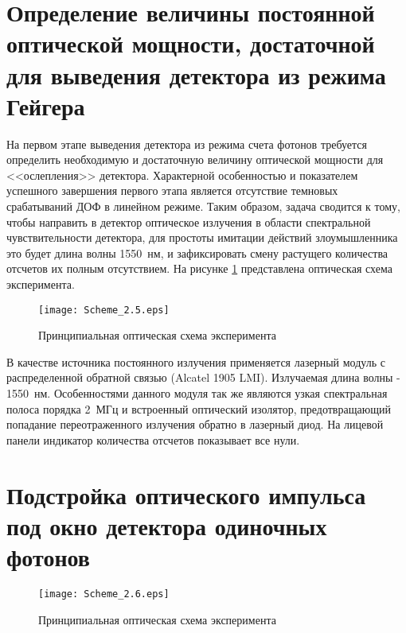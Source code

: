 
\section{Определение величины постоянной оптической мощности, достаточной для выведения детектора из режима Гейгера} \label{sec:ch2/sec5}

На первом этапе выведения детектора из режима счета фотонов требуется определить необходимую и достаточную величину оптической мощности для <<ослепления>> детектора. Характерной особенностью и показателем успешного завершения первого этапа является отсутствие темновых срабатываний ДОФ в линейном режиме. Таким образом, задача сводится к тому, чтобы направить в детектор оптическое излучения в области спектральной чувствительности детектора, для простоты имитации действий злоумышленника это будет длина волны 1550~нм, и зафиксировать смену растущего количества отсчетов их полным отсутствием. На рисунке \ref{fig:Scheme_2.5} представлена оптическая схема эксперимента. 


 \begin{figure}[ht]
  \centering
  \texttt{[image: Scheme\_2.5.eps]}
  \caption{Принципиальная оптическая схема эксперимента}
  \label{fig:Scheme_2.5}
\end{figure}

В качестве источника постоянного излучения применяется лазерный модуль с распределенной обратной связью (Alcatel 1905 LMI). Излучаемая длина волны - 1550~нм. Особенностями данного модуля так же являются узкая спектральная полоса порядка 2~МГц и встроенный оптический изолятор, предотвращающий попадание переотраженного излучения обратно в лазерный диод. 
 На лицевой панели индикатор количества отсчетов показывает все нули. 







\section{Подстройка оптического импульса под окно детектора одиночных фотонов} \label{sec:ch2/sec6}


 \begin{figure}[ht]
  \centering
  \texttt{[image: Scheme\_2.6.eps]}
  \caption{Принципиальная оптическая схема эксперимента}
  \label{fig:Scheme_2.6}
\end{figure}

